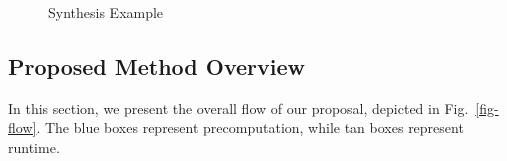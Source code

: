 \begin{figure}
\begin{minipage}[t]{0.45\textwidth}
{\begin{tikzpicture}[
          font=\small,
          box/.style={draw, rounded corners=2pt, align=left, inner sep=6pt},
          >=Latex
        ]
      \end{tikzpicture}
    }
    \label{fig-esop-simp}
  \end{minipage}
  \begin{minipage}[t]{0.45\linewidth}
    \vspace{0pt}
    \hspace{-1cm}
    \centering
    \scalebox{0.8} {
      
    }
    \label{fig-ex-network-og}
  \end{minipage}
  \begin{minipage}[t]{0.45\linewidth}
    \vspace{0pt}
    \centering
    \scalebox{0.8} {
      
    }
    \label{fig-ex-network}
  \end{minipage}
  \begin{minipage}[t]{0.45\textwidth}
    \vspace{0pt}
    \centering
    \scalebox{0.8} {
      
    }
    \label{fig-ex-qc}
  \end{minipage}
  \caption{Synthesis Example}
  \label{fig-ex-pro}
\end{figure}

\subsection{Proposed Method Overview}
\label{Subsec:ProMet}
In this section, we present the overall flow of our proposal, depicted in Fig.~\ref{fig-flow}. The blue boxes represent precomputation, while tan boxes represent runtime.

